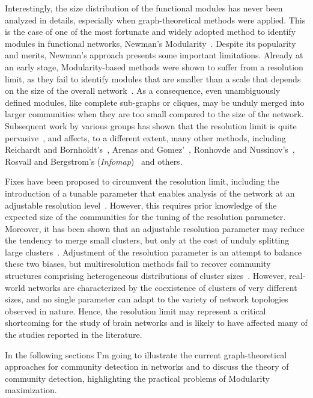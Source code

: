 Interestingly, the size distribution of the functional modules has never been analyzed in details, especially when graph-theoretical methods were applied.
This is the case of one of the most fortunate and widely adopted method to identify modules in functional networks, Newman's Modularity~\cite{newman2006}.
Despite its popularity and merits, Newman's approach presents some important limitations.
Already at an early stage, Modularity-based methods were shown to suffer from a resolution limit, as they fail to identify modules that are smaller than a scale that depends on the size of the overall network~\cite{fortunato2007}.
As a consequence, even unambiguously defined modules, like complete sub-graphs or cliques, may be unduly merged into larger communities when they are too small compared to the size of the network.
Subsequent work by various groups has shown that the resolution limit is quite pervasive~\cite{lancichinetti2009,traag2011,squartini2015,lancichinetti2011,kawamoto2015}, and affects, to a different extent, many other methods, including Reichardt and Bornholdt’s~\cite{reichardt2006}, Arenas and Gomez'~\cite{arenas2008}, Ronhovde and Nussinov's~\cite{ronhovde2009}, Rosvall and Bergstrom's (\emph{Infomap})~\cite{rosvall2008,kawamoto2015} and others.

Fixes have been proposed to circumvent the resolution limit, including the introduction of a tunable parameter that enables analysis of the network at an adjustable resolution level~\cite{reichardt2006,ronhovde2010,yeo2011}. However, this requires prior knowledge of the expected size of the communities for the tuning of the resolution parameter. Moreover, it has been shown that an  adjustable resolution parameter may reduce the tendency to merge small clusters, but only at the cost of unduly splitting large clusters~\cite{lancichinetti2011}. Adjustment of the resolution parameter is an attempt to balance these two biases, but multiresolution methods fail to recover community structures comprising heterogeneous distributions of cluster sizes~\cite{lancichinetti2011}. 
However, real-world networks are characterized by the coexistence of clusters of very different sizes, and no single parameter can adapt to the variety of network topologies observed in nature.
Hence, the resolution limit may represent a critical shortcoming for the study of brain networks and is likely to have affected many of the studies reported in the literature.

In the following sections I'm going to illustrate the current graph-theoretical approaches for community detection in networks and to discuss the theory of community detection, highlighting the practical problems of Modularity maximization.


